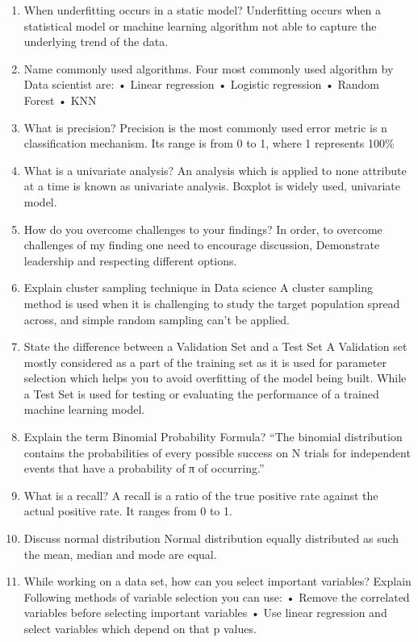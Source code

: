 \documentclass[
]{book}
\begin{document}
\begin{enumerate}
\item
  When underfitting occurs in a static model?
  Underfitting occurs when a statistical model or machine learning algorithm not able to capture the underlying trend of the data.
\item
  Name commonly used algorithms.
  Four most commonly used algorithm by Data scientist are:
  • Linear regression
  • Logistic regression
  • Random Forest
  • KNN
\item
  What is precision?
  Precision is the most commonly used error metric is n classification mechanism. Its range is from 0 to 1, where 1 represents 100\%
\item
  What is a univariate analysis?
  An analysis which is applied to none attribute at a time is known as univariate analysis. Boxplot is widely used, univariate model.
\item
  How do you overcome challenges to your findings?
  In order, to overcome challenges of my finding one need to encourage discussion, Demonstrate leadership and respecting different options.
\item
  Explain cluster sampling technique in Data science
  A cluster sampling method is used when it is challenging to study the target population spread across, and simple random sampling can't be applied.
\item
  State the difference between a Validation Set and a Test Set
  A Validation set mostly considered as a part of the training set as it is used for parameter selection which helps you to avoid overfitting of the model being built.
  While a Test Set is used for testing or evaluating the performance of a trained machine learning model.
\item
  Explain the term Binomial Probability Formula?
  ``The binomial distribution contains the probabilities of every possible success on N trials for independent events that have a probability of π of occurring.''
\item
  What is a recall?
  A recall is a ratio of the true positive rate against the actual positive rate. It ranges from 0 to 1.
\item
  Discuss normal distribution
  Normal distribution equally distributed as such the mean, median and mode are equal.
\item
  While working on a data set, how can you select important variables? Explain
  Following methods of variable selection you can use:
  • Remove the correlated variables before selecting important variables
  • Use linear regression and select variables which depend on that p values.

\end{enumerate}
\end{document}
